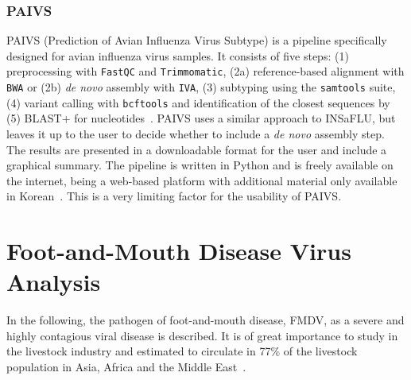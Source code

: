 \subsubsection{PAIVS}
\ac{PAIVS} (Prediction of Avian Influenza Virus Subtype) is a pipeline specifically designed for avian influenza virus samples. It consists of five steps: (1) preprocessing with \texttt{FastQC} and \texttt{Trimmomatic}, (2a) reference-based alignment with \texttt{BWA} or (2b) \textit{de novo} assembly with \texttt{IVA}, (3) subtyping using the \texttt{samtools} suite, (4) variant calling with \texttt{bcftools} and identification of the closest sequences by (5) \ac{BLAST}+ for nucleotides~\cite{park2020paivs}. \ac{PAIVS} uses a similar approach to \ac{INSaFLU}, but leaves it up to the user to decide whether to include a \textit{de novo} assembly step. The results are presented in a downloadable format for the user and include a graphical summary. The pipeline is written in Python and is freely available on the internet, being a web-based platform with additional material only available in Korean~\cite{park2020paivs}. This is a very limiting factor for the usability of \ac{PAIVS}.

\section{Foot-and-Mouth Disease Virus Analysis}
In the following, the pathogen of foot-and-mouth disease, \ac{FMDV}, as a severe and highly contagious viral disease is described. It is of great importance to study in the livestock industry and estimated to circulate in 77\% of the livestock population in Asia, Africa and the Middle East~\cite{woah2023fmd}.

